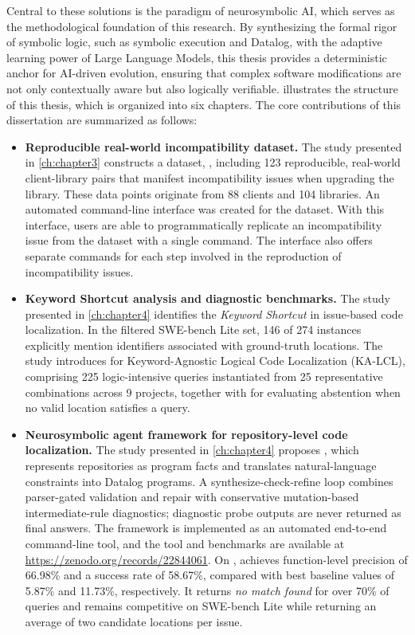 Central to these solutions is the paradigm of neurosymbolic AI, which serves as the methodological foundation of this research. By synthesizing the formal rigor of symbolic logic, such as symbolic execution and Datalog, with the adaptive learning power of Large Language Models, this thesis provides a deterministic anchor for AI-driven evolution, ensuring that complex software modifications are not only contextually aware but also logically verifiable.  illustrates the structure of this thesis, which is organized into six chapters. The core contributions of this dissertation are summarized as follows:

\begin{itemize}
  \item \textbf{Reproducible real-world incompatibility dataset.} The study presented in \cref{ch:chapter3} constructs a dataset, \toolcompsuite, including 123 reproducible, real-world client-library pairs that manifest incompatibility issues when upgrading the library. These data points originate from 88 clients and 104 libraries. An automated command-line interface was created for the dataset. With this interface, users are able to programmatically replicate an incompatibility issue from the dataset with a single command. The interface also offers separate commands for each step involved in the reproduction of incompatibility issues.
  \item \textbf{Keyword Shortcut analysis and diagnostic benchmarks.} The study presented in \cref{ch:chapter4} identifies the \textit{Keyword Shortcut} in issue-based code localization. In the filtered SWE-bench Lite set, 146 of 274 instances explicitly mention identifiers associated with ground-truth locations. The study introduces \dataset for Keyword-Agnostic Logical Code Localization (KA-LCL), comprising 225 logic-intensive queries instantiated from 25 representative combinations across 9 projects, together with \negset for evaluating abstention when no valid location satisfies a query.
  \item \textbf{Neurosymbolic agent framework for repository-level code localization.} The study presented in \cref{ch:chapter4} proposes \tooldataloc, which represents repositories as program facts and translates natural-language constraints into Datalog programs. A synthesize-check-refine loop combines parser-gated validation and repair with conservative mutation-based intermediate-rule diagnostics; diagnostic probe outputs are never returned as final answers. The framework is implemented as an automated end-to-end command-line tool, and the tool and benchmarks are available at \url{https://zenodo.org/records/22844061}. On \dataset, \tooldataloc achieves function-level precision of 66.98\% and a success rate of 58.67\%, compared with best baseline values of 5.87\% and 11.73\%, respectively. It returns \textit{no match found} for over 70\% of \negset queries and remains competitive on SWE-bench Lite while returning an average of two candidate locations per issue.

\end{itemize}
